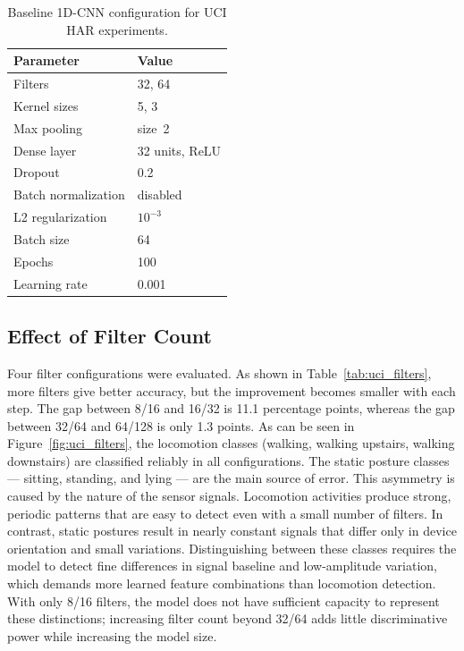 \begin{table}[ht]
  \centering
  \caption{Baseline 1D-CNN configuration for UCI HAR experiments.}
  \label{tab:baseline}
  \begin{tabular}{ll}
    \toprule
    \textbf{Parameter}    & \textbf{Value} \\
    \midrule
    Filters               & 32, 64 \\
    Kernel sizes          & 5, 3 \\
    Max pooling           & size~2 \\
    Dense layer           & 32 units, ReLU \\
    Dropout               & 0.2 \\
    Batch normalization   & disabled \\
    L2 regularization     & $10^{-3}$ \\
    Batch size            & 64 \\
    Epochs                & 100 \\
    Learning rate         & 0.001 \\
    \bottomrule
  \end{tabular}
\end{table}
 
\subsection{Effect of Filter Count}

Four filter configurations were evaluated. As shown in Table~\ref{tab:uci_filters}, more filters give better accuracy, but the improvement becomes smaller with each step. The gap between 8/16 and 16/32 is 11.1 percentage points, whereas the gap between 32/64 and 64/128 is only 1.3 points. As can be seen in Figure~\ref{fig:uci_filters}, the locomotion classes (walking, walking upstairs, walking downstairs) are classified reliably in all configurations. The static posture classes — sitting, standing, and lying — are the main source of error. This asymmetry is caused by the nature of the sensor signals. Locomotion activities produce strong, periodic patterns that are easy to detect even with a small number of filters. In contrast, static postures result in nearly constant signals that differ only in device orientation and small variations. Distinguishing between these classes requires the model to detect fine differences in signal baseline and low-amplitude variation, which demands more learned feature combinations than locomotion detection. With only 8/16 filters, the model does not have sufficient capacity to represent these distinctions; increasing filter count beyond 32/64 adds little discriminative power while increasing the model size.

